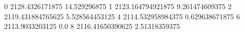 0 2128.4326171875 14.529296875
1 2123.164794921875 9.261474609375
2 2119.431884765625 5.528564453125
4 2114.532958984375 0.629638671875
6 2113.9033203125 0.0
8 2116.41650390625 2.51318359375
